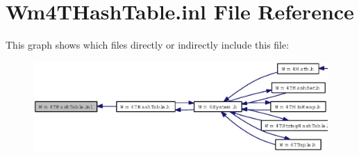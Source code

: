 \section{Wm4THash\-Table.inl File Reference}
\label{Wm4THashTable_8inl}


This graph shows which files directly or indirectly include this file:\begin{figure}[H]
\begin{center}
\leavevmode
\includegraphics[width=371pt]{Wm4THashTable_8inl__dep__incl}
\end{center}
\end{figure}
